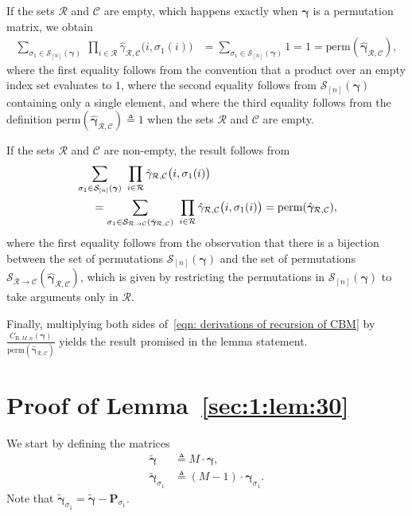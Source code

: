 \documentclass[journal,lettersize,twocolumn]{IEEEtran} %
\newcommand{\vect}[1]{ \bm{#1} }
\newcommand{\set}[1]{\mathcal{#1}}
\newcommand{\vgam}{ \vect{\gamma} }
\newcommand{\matr}[1]{ \bm{#1} }
\newcommand{\defeq}{ \triangleq }
\newcommand{\perm}{ \mathrm{perm} }
\newcommand{\setC}{\set{C}}
\newcommand{\setR}{\set{R}}
\newcommand{\setS}{\set{S}}
\newcommand{\CBM}[1]{\CBgen{M}{#1}}
\newcommand{\CBgen}[2]{C_{\mathrm{B},#1,#2}}
\newcommand{\isigmaoi}{\bigl( i,\sigma_1(i) \bigr)}
\newcommand{\tvgam}{\tilde{\vgam}}
\newcommand{\mP}{\matr{P}}
\newcommand{\hvgamRCp}{ \hat{\vgam}_{\setR,\setC} }
\newcommand{\hgamRCp}{ \hat{\gamma}_{\setR,\setC} }
\begin{document}
\begin{appendices}
\begin{itemize}
  If the sets $\setR$ and $\setC$ are empty, which happens exactly when
  $\vgam$ is a permutation matrix, we obtain
  \begin{align*}
    \sum_{\sigma_1 \in \setS_{[n]}( \vgam )} \ 
      \prod_{i \in \setR}
        \hgamRCp\isigmaoi 
      &= \!\!\!\!\!\! \sum_{\sigma_1 \in \setS_{[n]}( \vgam )} \!\!\!\!\!\!
           1
       = 1
       = \perm(\hvgamRCp),
  \end{align*}
  where the first equality follows from the convention that a product over an
  empty index set evaluates to $1$, where the second equality follows from
  $\setS_{[n]}( \vgam )$ containing only a single element, and where the third
  equality follows from the definition $\perm(\hvgamRCp) \defeq 1$ when the
  sets $\setR$ and $\setC$ are empty.

  If the sets $\setR$ and $\setC$ are non-empty, the result follows from
  \begin{align*}
    \hspace{0.5cm}&\hspace{-0.50cm}
    \sum_{\sigma_1 \in \setS_{[n]}( \vgam )} \ 
      \prod_{i \in \setR} 
        \hgamRCp\isigmaoi \\
      &= \sum_{\sigma_1 \in \setS_{\setR \to \setC}( \hvgamRCp )} \ 
           \prod_{i \in \setR} 
             \hgamRCp\isigmaoi
       = \perm(\hvgamRCp),
  \end{align*}
  where the first equality follows from the observation that there is a
  bijection between the set of permutations $\setS_{[n]}( \vgam )$ and the set
  of permutations $\setS_{\setR \to \setC}(\hvgamRCp)$, which is given by
  restricting the permutations in $\setS_{[n]}( \vgam )$ to take arguments
  only in $\setR$.

%
%
%
%
%
%
%
%
%
%

\end{itemize}
Finally, multiplying both sides of~\eqref{eqn: derivations of recursion of
  CBM} by $\frac{\CBM{n}(\vgam)}{\perm(\hvgamRCp)}$ yields the result promised
in the lemma statement.

%
%

\ifx\withclearpagecommands\x
\clearpage
\mbox{}
\newpage
\fi

\section{Proof of Lemma~\ref{sec:1:lem:30}}
\label{apx:23}


%
%

We start by defining the matrices
\begin{align*}
  \tvgam
    &\defeq 
       M \cdot \vgam, \\ 
  \tvgam_{\sigma_1}
    &\defeq 
       (M-1) \cdot \vgam_{\sigma_1}.
\end{align*}
Note that $\tvgam_{\sigma_1} = \tvgam - \mP_{\sigma_1}$.


\end{appendices}
\end{document}
